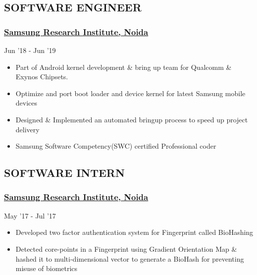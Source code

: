 \documentclass[letterpaper]{twentysecondcv} %
\begin{document}
\subsection{SOFTWARE ENGINEER}\subsubsection{\href{https://research.samsung.com/sri-n}{Samsung Research Institute, Noida}}  \hfill{} Jun '18 - Jun '19
\begin{itemize}
    \item Part of Android kernel development \& bring up team for Qualcomm \& Exynos Chipsets.%
    \item Optimize and port boot loader and device kernel for latest Samsung mobile devices
    \item Designed \& Implemented an automated bringup process to speed up project delivery
    \item Samsung Software Competency(SWC) certified Professional coder
\end{itemize}
\subsection{SOFTWARE INTERN}\subsubsection{\href{https://research.samsung.com/sri-n}{Samsung Research Institute, Noida}}\hfill{}  May '17 - Jul '17
\begin{itemize}
    \item Developed two factor authentication system for Fingerprint called BioHashing
\item Detected core-points in a Fingerprint using Gradient Orientation Map \& hashed it to multi-dimensional vector to generate a BioHash for preventing misuse of biometrics
\end{itemize}
\end{document}

